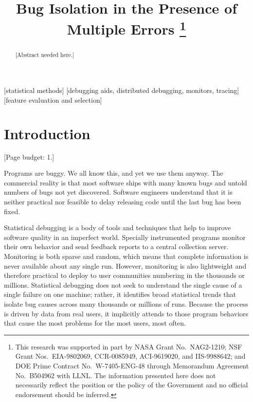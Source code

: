\documentclass{sig-alternate}
\title{Bug Isolation in the Presence of Multiple Errors
  \thanks{This research was supported in part by NASA Grant No.\ 
    NAG2-1210; NSF Grant Nos.\ EIA-9802069, CCR-0085949, ACI-9619020,
    and IIS-9988642; and DOE Prime Contract No.\ W-7405-ENG-48 through
    Memorandum Agreement No.\ B504962 with LLNL.  The information
    presented here does not necessarily reflect the position or the
    policy of the Government and no official endorsement should be
    inferred.}}
\author{
  \alignauthor Ben Liblit \eecs \\
  \alignauthor Mayur Naik \stan \\
  \alignauthor Alice X.\ Zheng \eecs \\
  \moreauthors
  \global\multiply\auwidth by 3
  \global\divide\auwidth by 2
  \alignauthor Alex Aiken \stan \\
  \alignauthor Michael I.\ Jordan \both
  \moreauthors
  \alignauthor
  \affaddr{\eecs Department of Electrical \\ Engineering and Computer Science} \\
  \affaddr{\stat Department of Statistics} \\
  \affaddr{University of California, Berkeley} \\
  \affaddr{Berkeley, CA 94720-1776}
  \alignauthor
  \affaddr{\stan Computer Science Department} \\
  \affaddr{353 Serra Mall} \\
  \affaddr{Stanford University} \\
  \affaddr{Stanford CA 94305-9025}
}
\newcommand{\placeholder}[1]{{\color[cmyk]{0,0.61,0.87,0}[#1]}}
\begin{document}
\CopyrightYear{2004}
\maketitle

\begin{abstract}
\placeholder{Abstract needed here.}
\end{abstract}

[statistical methods]
[debugging aids, distributed debugging, monitors, tracing]
[feature
  evaluation and selection]




\section{Introduction}
\label{sec:introduction}

\placeholder{Page budget: 1.}

Programs are buggy.  We all know this, and yet we use them anyway.
The commercial reality is that most software ships with many known
bugs and untold numbers of bugs not yet discovered.  Software
engineers understand that it is neither practical nor feasible to
delay releasing code until the last bug has been fixed.

Statistical debugging is a body of tools and techniques that help to
improve software quality in an imperfect world.  Specially
instrumented programs monitor their own behavior and send feedback
reports to a central collection server.  Monitoring is both sparse and
random, which means that complete information is never available about
any single run.  However, monitoring is also lightweight and therefore
practical to deploy to user communities numbering in the thousands or
millions.  Statistical debugging does not seek to understand the
single cause of a single failure on one machine; rather, it identifies
broad statistical trends that isolate bug causes across many thousands
or millions of runs.  Because the process is driven by data from real
users, it implicitly attends to those program behaviors that cause the
most problems for the most users, most often.
\end{document}
